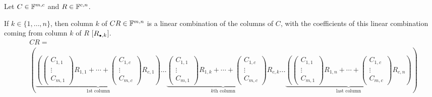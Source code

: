 \begin{thm}
  Let $C\in\mathbb{F}^{m,c}$ and $R\in\mathbb{F}^{c,n}$.

   If $k \in \{1,\ldots,n\}$, then column $k$ of $CR\in \mathbb{F}^{m,n}$ is a linear combination of the columns of $C$, with the coefficients of this linear combination coming from column $k$ of $R$ [$R_{\mathsmaller{\bullet}, k}$].
  \begin{equation}
    \begin{aligned}
      &CR = \\
      &\left(
      \underbrace{
      \left(
       \left(
          \begin{matrix}C_{1,1}
            \\ \vdots \\ C_{m,1}
          \end{matrix}
        \right) R_{1,1}
        + \cdots +
        \left(
          \begin{matrix}C_{1,c}
            \\ \vdots \\ C_{m,c}
          \end{matrix}
        \right) R_{c,1}
        \right)
      }_{\text{$1$st column}}
      \ldots
      \underbrace{
        \boxed{
          \left(
            \begin{matrix}C_{1,1}
              \\ \vdots \\ C_{m,1}
            \end{matrix}
          \right) R_{1,k}
          + \cdots +
          \left(
            \begin{matrix}C_{1,c}
              \\ \vdots \\ C_{m,c}
            \end{matrix}
          \right) R_{c,k}
        }
      }_{\text{$k$th column}}
      \ldots
      \underbrace{
        \left(
          \left(
            \begin{matrix}C_{1,1}
              \\ \vdots \\ C_{m,1}
            \end{matrix}
          \right) R_{1,n}
          + \cdots +
          \left(
            \begin{matrix}C_{1,c}
              \\ \vdots \\ C_{m,c}
            \end{matrix}
          \right) R_{c,n}
        \right)
      }_{\text{last column}}
      \right)
    \end{aligned}
  \end{equation}


\end{thm}

